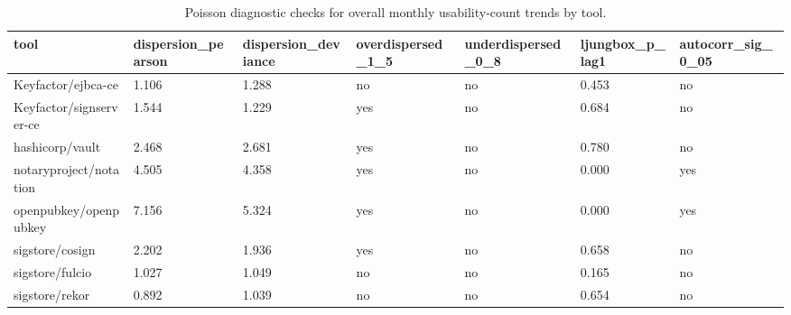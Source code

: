 \begin{table}[t]
\centering
\caption{Poisson diagnostic checks for overall monthly usability-count trends by tool.}
\label{tab:poisson-diagnostics-overall-by-tool}
\scriptsize
\begin{tabular}{lllllll}
\hline
tool & dispersion\_pearson & dispersion\_deviance & overdispersed\_1\_5 & underdispersed\_0\_8 & ljungbox\_p\_lag1 & autocorr\_sig\_0\_05 \\
\hline
Keyfactor/ejbca-ce & 1.106 & 1.288 & no & no & 0.453 & no \\
Keyfactor/signserver-ce & 1.544 & 1.229 & yes & no & 0.684 & no \\
hashicorp/vault & 2.468 & 2.681 & yes & no & 0.780 & no \\
notaryproject/notation & 4.505 & 4.358 & yes & no & 0.000 & yes \\
openpubkey/openpubkey & 7.156 & 5.324 & yes & no & 0.000 & yes \\
sigstore/cosign & 2.202 & 1.936 & yes & no & 0.658 & no \\
sigstore/fulcio & 1.027 & 1.049 & no & no & 0.165 & no \\
sigstore/rekor & 0.892 & 1.039 & no & no & 0.654 & no \\
\hline
\end{tabular}
\end{table}
